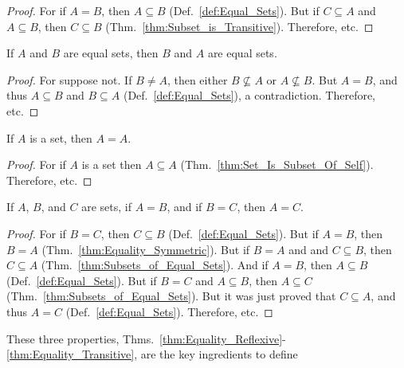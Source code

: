         \begin{proof}
            For if $A=B$, then $A\subseteq{B}$ (Def.~\ref{def:Equal_Sets}).
            But if $C\subseteq{A}$ and $A\subseteq{B}$, then $C\subseteq{B}$
            (Thm.~\ref{thm:Subset_is_Transitive}). Therefore, etc.
        \end{proof}
        \begin{theorem}
            \label{thm:Equality_Symmetric}%
            If $A$ and $B$ are equal sets, then $B$ and
            $A$ are equal sets.
        \end{theorem}
        \begin{proof}
            For suppose not. If $B\ne{A}$, then either
            $B\nsubseteq{A}$ or $A\nsubseteq{B}$.
            But $A=B$, and thus $A\subseteq{B}$  and
            $B\subseteq{A}$ (Def.~\ref{def:Equal_Sets}),
            a contradiction. Therefore, etc.
        \end{proof}
        \begin{theorem}
            \label{thm:Equality_Reflexive}%
            If $A$ is a set, then $A=A$.
        \end{theorem}
        \begin{proof}
            For if $A$ is a set then $A\subseteq{A}$
            (Thm.~\ref{thm:Set_Is_Subset_Of_Self}).
            Therefore, etc.
        \end{proof}
        \begin{theorem}
            \label{thm:Equality_Transitive}%
            If $A$, $B$, and $C$ are sets, if $A=B$, and if
            $B=C$, then $A=C$.
        \end{theorem}
        \begin{proof}
            For if $B=C$, then $C\subseteq{B}$
            (Def.~\ref{def:Equal_Sets}). But if
            $A=B$, then $B=A$
            (Thm.~\ref{thm:Equality_Symmetric}). But if
            $B=A$ and and $C\subseteq{B}$, then
            $C\subseteq{A}$
            (Thm.~\ref{thm:Subsets_of_Equal_Sets}).
            And if $A=B$, then $A\subseteq{B}$
            (Def.~\ref{def:Equal_Sets}). But if $B=C$ and
            $A\subseteq{B}$, then $A\subseteq{C}$
            (Thm.~\ref{thm:Subsets_of_Equal_Sets}). But it
            was just proved that $C\subseteq{A}$, and
            thus $A=C$ (Def.~\ref{def:Equal_Sets}).
            Therefore, etc.
        \end{proof}
        These three properties,
        Thms.~\ref{thm:Equality_Reflexive}-%
        \ref{thm:Equality_Transitive}, are the key ingredients to define
